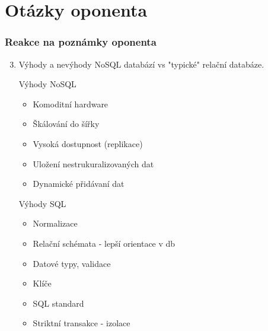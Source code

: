 \documentclass[unicode,bookmarksnumbered]{beamer}
\begin{document}
	\section{Otázky oponenta}
	\begin{frame}
		\frametitle{Reakce na poznámky oponenta}
		

		\begin{enumerate}
					     \setcounter{enumi}{2}
			\item Výhody a nevýhody NoSQL databází vs "typické" relační databáze.
			
						Výhody NoSQL 
						\begin{itemize}
							\item Komoditní hardware
							\item Škálování do šířky
							\item Vysoká dostupnost (replikace)
							\item Uložení nestrukuralizovaných dat
							\item Dynamické přidávaní dat
						\end{itemize}
						
						Výhody SQL
					\begin{itemize}
						\item Normalizace 
						\item Relační schémata - lepší orientace v db
						\item Datové typy, validace
						\item Klíče
						\item SQL standard
						\item Striktní transakce - izolace
					\end{itemize}
		\end{enumerate}
	\end{frame}
	


	
	
	
	
	
\end{document}
